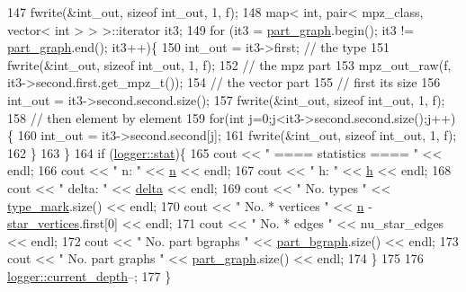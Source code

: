 \begin{DoxyCode}
147   fwrite(&int\_out, \textcolor{keyword}{sizeof} int\_out, 1, f);
148   map< int, pair< mpz\_class, vector< int > > >::iterator it3;
149   \textcolor{keywordflow}{for} (it3 = \hyperlink{classmarked__graph__compressed_ae179a4737e6eab905c18a94d44ef64b7}{part\_graph}.begin(); it3 != \hyperlink{classmarked__graph__compressed_ae179a4737e6eab905c18a94d44ef64b7}{part\_graph}.end(); it3++)\{
150     int\_out = it3->first; \textcolor{comment}{// the type}
151     fwrite(&int\_out, \textcolor{keyword}{sizeof} int\_out, 1, f);
152     \textcolor{comment}{// the mpz part}
153     mpz\_out\_raw(f, it3->second.first.get\_mpz\_t());
154     \textcolor{comment}{// the vector part}
155     \textcolor{comment}{// first its size}
156     int\_out = it3->second.second.size();
157     fwrite(&int\_out, \textcolor{keyword}{sizeof} int\_out, 1, f);
158     \textcolor{comment}{// then element by element}
159     \textcolor{keywordflow}{for}(\textcolor{keywordtype}{int} j=0;j<it3->second.second.size();j++)\{
160       int\_out = it3->second.second[j];
161       fwrite(&int\_out, \textcolor{keyword}{sizeof} int\_out, 1, f);
162     \}
163   \}
164   \textcolor{keywordflow}{if} (\hyperlink{classlogger_a26812b5ba03f130e8dae3446d5fc032f}{logger::stat})\{
165     cout << \textcolor{stringliteral}{" ==== statistics ==== "} << endl;
166     cout << \textcolor{stringliteral}{" n:                "} << \hyperlink{classmarked__graph__compressed_a8d841016ddb11cfd33748c8deb6277ba}{n} << endl;
167     cout << \textcolor{stringliteral}{" h:                "} << \hyperlink{classmarked__graph__compressed_af6ff623407b673d08d0cab77b39c2193}{h} << endl;
168     cout << \textcolor{stringliteral}{" delta:            "} << \hyperlink{classmarked__graph__compressed_a8b2aaac68e9332ddc78d88eb60b323a7}{delta} << endl;
169     cout << \textcolor{stringliteral}{" No. types         "} << \hyperlink{classmarked__graph__compressed_a86b00223525703e973415cbc9c94da68}{type\_mark}.size() << endl;
170     cout << \textcolor{stringliteral}{" No. * vertices    "} << \hyperlink{classmarked__graph__compressed_a8d841016ddb11cfd33748c8deb6277ba}{n} - \hyperlink{classmarked__graph__compressed_a7a4ced4586e2e353f9076bd447df5208}{star\_vertices}.first[0] << endl;
171     cout << \textcolor{stringliteral}{" No. * edges       "} << nu\_star\_edges << endl;
172     cout << \textcolor{stringliteral}{" No. part bgraphs  "} << \hyperlink{classmarked__graph__compressed_a7b3267063fba30b45eb21b3ba4e07536}{part\_bgraph}.size() << endl;
173     cout << \textcolor{stringliteral}{" No. part graphs   "} << \hyperlink{classmarked__graph__compressed_ae179a4737e6eab905c18a94d44ef64b7}{part\_graph}.size() << endl;
174   \}
175 
176   \hyperlink{classlogger_a9d29b49bd318a719a8e85b59eac54fe0}{logger::current\_depth}--;
177 \}
\end{DoxyCode}
\mbox{\label{classmarked__graph__compressed_af58307bfadcaa4c3ca6dd594c2f9b3a9}} 
